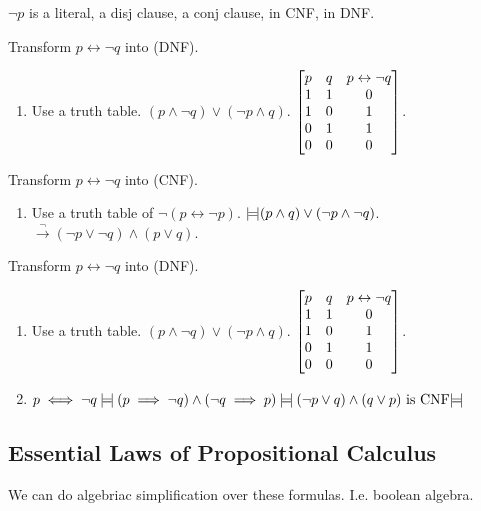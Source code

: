 \documentclass[12pt]{article}
\begin{document}
\(\neg p\) is a literal, a disj clause, a conj clause, in CNF, in DNF.

\bboxexam
\begin{exam}
  Transform \(p\leftrightarrow\neg q\) into (DNF).
  \begin{enumerate}
    \item Use a truth table. \((p\wedge\neg q)\vee(\neg p\wedge q)\).
      \(\begin{bmatrix} p&q&p\leftrightarrow\neg q\\ 1&1&0\\ 1&0&1\\ 0&1&1\\ 0&0&0 \end{bmatrix}\).
  \end{enumerate}
  Transform \(p\leftrightarrow\neg q\) into (CNF).
  \begin{enumerate}
    \item Use a truth table of \(\neg(p\leftrightarrow\neg p)\). 
      \(\mathbin{\mid\!=\!\mid}(p\wedge q)\vee(\neg p\wedge \neg q)\).
      \(\overset\neg\longrightarrow(\neg p\vee \neg q)\wedge(p\vee q)\).
  \end{enumerate}
\end{exam}
\ebox

\bboxexam
\begin{exam}
  Transform \(p\leftrightarrow\neg q\) into (DNF).
  \begin{enumerate}
    \item Use a truth table. \((p\wedge\neg q)\vee(\neg p\wedge q)\).
      \(\begin{bmatrix} p&q&p\leftrightarrow\neg q\\ 1&1&0\\ 1&0&1\\ 0&1&1\\ 0&0&0 \end{bmatrix}\).
    \item \(p\iff\neg q\mathbin{\mid\!=\!\mid}(p\implies\neg q)\wedge(\neg q\implies p)\mathbin{\mid\!=\!\mid}
      (\neg p\vee q)\wedge(q\vee p)\text{ is CNF}\mathbin{\mid\!=\!\mid} \)
  \end{enumerate}
\end{exam}
\ebox

\subsection{Essential Laws of Propositional Calculus}

We can do algebriac simplification over these formulas. I.e. boolean algebra.
\end{document}

